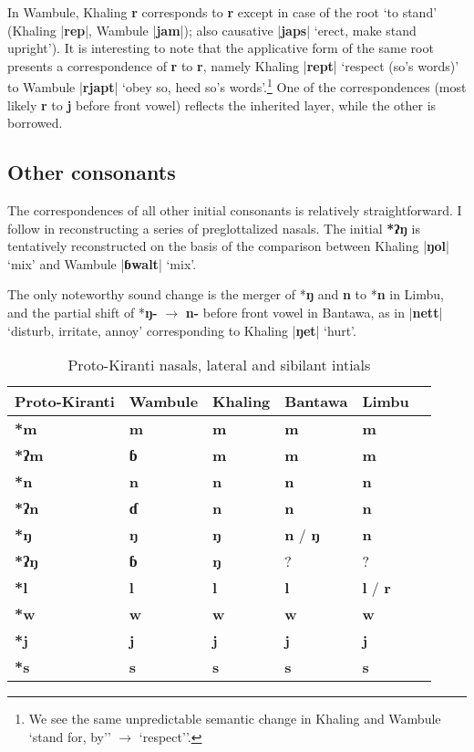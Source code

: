 \documentclass[oneside,a4paper,11pt]{article}
\newcommand{\ipa}[1]{\textbf{{\phon\mbox{#1}}}} %
\newcommand{\dhatu}[2]{|\ipa{#1}| `#2'}
\newcommand{\change}[2]{*\ipa{#1} $\rightarrow$ \ipa{#2}}
\begin{document}
In Wambule, Khaling \ipa{r} corresponds to \ipa{r} except in case of the root `to stand' (Khaling |\ipa{rep}|, Wambule  |\ipa{jam}|); also causative \dhatu{japs}{erect, make stand upright}). It is interesting to note that the applicative form of the same root presents a correspondence of \ipa{r} to \ipa{r}, namely Khaling \dhatu{rept}{respect (so's words)} to Wambule \dhatu{rjapt}{obey so, heed so's words}.\footnote{We see the same unpredictable semantic change in Khaling and Wambule `stand for, by'' $\rightarrow$ `respect''.} One of the correspondences (most likely \ipa{r} to \ipa{j} before front vowel) reflects the inherited layer, while the other is borrowed.  

\subsection{Other consonants}
The correspondences of all other initial consonants is relatively straightforward. I follow \citet{opgenort04implosives} in reconstructing a series of preglottalized nasals. The initial \ipa{*ʔŋ} is tentatively reconstructed on the basis of the comparison between Khaling \dhatu{ŋol}{mix} and Wambule \dhatu{ɓwalt}{mix}.

The only noteworthy sound change is the merger of *\ipa{ŋ} and \ipa{n} to *\ipa{n} in Limbu, and the partial shift of \change{ŋ-}{n-} before front vowel in Bantawa, as in \dhatu{nett}{disturb, irritate, annoy} corresponding to Khaling \dhatu{ŋet}{hurt}.

\begin{table}[H]
\caption{Proto-Kiranti nasals, lateral and sibilant intials} \centering \label{tab:nasals}
\begin{tabular}{llllll}
\toprule
Proto-Kiranti & Wambule & Khaling & Bantawa & Limbu \\
\midrule
\ipa{*m} & \ipa{m} & \ipa{m} & \ipa{m} & \ipa{m}  \\
\ipa{*ʔm} & \ipa{ɓ} & \ipa{m} & \ipa{m} & \ipa{m}  \\
\ipa{*n} & \ipa{n} & \ipa{n} & \ipa{n} & \ipa{n}  \\
\ipa{*ʔn} & \ipa{ɗ} & \ipa{n} & \ipa{n} & \ipa{n}  \\
\ipa{*ŋ} & \ipa{ŋ} & \ipa{ŋ} & \ipa{n} / \ipa{ŋ} & \ipa{n}  \\
\ipa{*ʔŋ} &  \ipa{ɓ}  & \ipa{ŋ} & ? &?  \\
\ipa{*l} & \ipa{l} & \ipa{l} & \ipa{l} & \ipa{l} / \ipa{r} \\
\ipa{*w} & \ipa{w} & \ipa{w} & \ipa{w} & \ipa{w} \\
\ipa{*j} & \ipa{j} & \ipa{j} & \ipa{j} & \ipa{j} \\
\ipa{*s} & \ipa{s} & \ipa{s} & \ipa{s} & \ipa{s}  \\
\bottomrule
\end{tabular}
\end{table}
\end{document}
